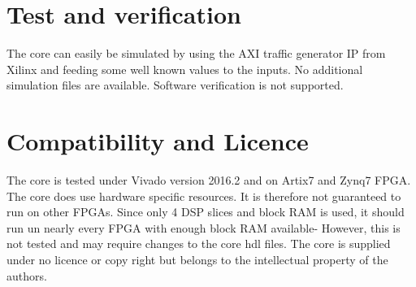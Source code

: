\section{Test and verification}
\label{sec::test}

The core can easily be simulated by using the AXI traffic generator IP from Xilinx and feeding some well known values to the inputs.
No additional simulation files are available.
Software verification is not supported.

\section{Compatibility and Licence}
The core is tested under Vivado version 2016.2 and on Artix7 and Zynq7 FPGA.
The core does use hardware specific resources.
It is therefore not guaranteed to run on other FPGAs.
Since only 4 DSP slices and block RAM is used, it should run un nearly every FPGA with enough block RAM available-
However, this is not tested and may require changes to the core hdl files.
The core is supplied under no licence or copy right but belongs to the intellectual property of the authors.

